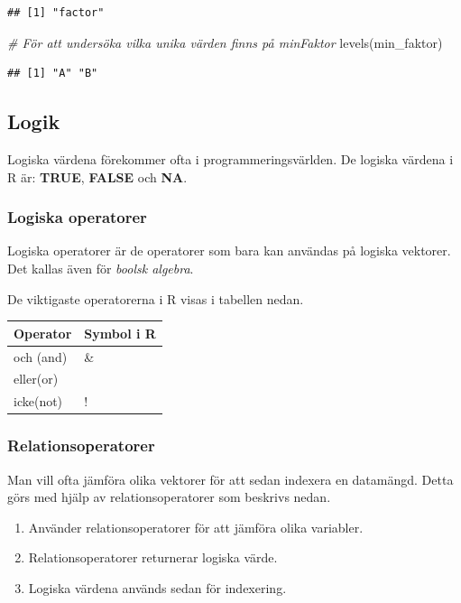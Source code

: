 \documentclass[
]{book}
\newenvironment{Shaded}{\begin{snugshade}}{\end{snugshade}}
\newcommand{\CommentTok}[1]{\textcolor[rgb]{0.56,0.35,0.01}{\textit{#1}}}
\newcommand{\FunctionTok}[1]{\textcolor[rgb]{0.00,0.00,0.00}{#1}}
\newcommand{\NormalTok}[1]{#1}
\providecommand{\tightlist}{%
  \setlength{\itemsep}{0pt}\setlength{\parskip}{0pt}}
\begin{document}
\begin{verbatim}
## [1] "factor"
\end{verbatim}

\begin{Shaded}
\begin{Highlighting}[]
\CommentTok{\# För att undersöka vilka unika värden finns på minFaktor }
\FunctionTok{levels}\NormalTok{(min\_faktor)}
\end{Highlighting}
\end{Shaded}

\begin{verbatim}
## [1] "A" "B"
\end{verbatim}

\hypertarget{logik}{%
\subsection{Logik}\label{logik}}

Logiska värdena förekommer ofta i programmeringsvärlden. De logiska värdena i R är: \textbf{TRUE}, \textbf{FALSE} och \textbf{NA}.

\hypertarget{logiska-operatorer}{%
\subsubsection{Logiska operatorer}\label{logiska-operatorer}}

Logiska operatorer är de operatorer som bara kan användas på logiska vektorer. Det kallas även för \emph{boolsk algebra}.

De viktigaste operatorerna i R visas i tabellen nedan.

\begin{longtable}[]{@{}ll@{}}
\toprule
Operator & Symbol i R\tabularnewline
\midrule
\endhead
och (and) & \&\tabularnewline
eller(or) & \textbar{}\tabularnewline
icke(not) & !\tabularnewline
\bottomrule
\end{longtable}

\hypertarget{relationsoperatorer}{%
\subsubsection{Relationsoperatorer}\label{relationsoperatorer}}

Man vill ofta jämföra olika vektorer för att sedan indexera en datamängd. Detta görs med hjälp av relationsoperatorer som beskrivs nedan.

\begin{enumerate}
\def\labelenumi{\arabic{enumi}.}
\tightlist
\item
  Använder relationsoperatorer för att jämföra olika variabler.
\item
  Relationsoperatorer returnerar logiska värde.
\item
  Logiska värdena används sedan för indexering.
\end{enumerate}
\end{document}
